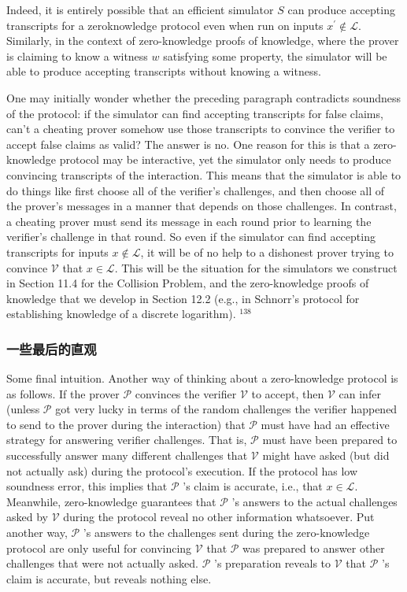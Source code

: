 Indeed, it is entirely possible that an efficient simulator $S$ can produce accepting transcripts for a zeroknowledge protocol even when run on inputs $x^{\prime} \notin \mathcal{L}$. Similarly, in the context of zero-knowledge proofs of knowledge, where the prover is claiming to know a witness $w$ satisfying some property, the simulator will be able to produce accepting transcripts without knowing a witness.

One may initially wonder whether the preceding paragraph contradicts soundness of the protocol: if the simulator can find accepting transcripts for false claims, can't a cheating prover somehow use those transcripts to convince the verifier to accept false claims as valid? The answer is no. One reason for this is that a zero-knowledge protocol may be interactive, yet the simulator only needs to produce convincing transcripts of the interaction. This means that the simulator is able to do things like first choose all of the verifier's challenges, and then choose all of the prover's messages in a manner that depends on those challenges. In contrast, a cheating prover must send its message in each round prior to learning the verifier's challenge in that round. So even if the simulator can find accepting transcripts for inputs $x \notin \mathcal{L}$, it will be of no help to a dishonest prover trying to convince $\mathcal{V}$ that $x \in \mathcal{L}$. This will be the situation for the simulators we construct in Section 11.4 for the Collision Problem, and the zero-knowledge proofs of knowledge that we develop in Section 12.2 (e.g., in Schnorr's protocol for establishing knowledge of a discrete logarithm). ${ }^{138}$

\subsubsection{一些最后的直观} Some final intuition. Another way of thinking about a zero-knowledge protocol is as follows. If the prover $\mathcal{P}$ convinces the verifier $\mathcal{V}$ to accept, then $\mathcal{V}$ can infer (unless $\mathcal{P}$ got very lucky in terms of the random challenges the verifier happened to send to the prover during the interaction) that $\mathcal{P}$ must have had an effective strategy for answering verifier challenges. That is, $\mathcal{P}$ must have been prepared to successfully answer many different challenges that $\mathcal{V}$ might have asked (but did not actually ask) during the protocol's execution. If the protocol has low soundness error, this implies that $\mathcal{P}$ 's claim is accurate, i.e., that $x \in \mathcal{L}$.
Meanwhile, zero-knowledge guarantees that $\mathcal{P}$ 's answers to the actual challenges asked by $\mathcal{V}$ during the protocol reveal no other information whatsoever. Put another way, $\mathcal{P}$ 's answers to the challenges sent during the zero-knowledge protocol are only useful for convincing $\mathcal{V}$ that $\mathcal{P}$ was prepared to answer other challenges that were not actually asked. $\mathcal{P}$ 's preparation reveals to $\mathcal{V}$ that $\mathcal{P}$ 's claim is accurate, but reveals nothing else.

